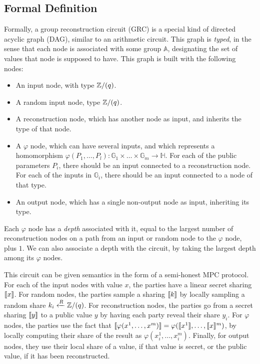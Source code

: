 \subsection{Formal Definition}

Formally, a group reconstruction circuit (GRC) is a special kind of
directed acyclic graph (DAG), similar to an arithmetic circuit.
This graph is \emph{typed}, in the sense that each node is associated
with some group $\mathbb{A}$, designating the set of values
that node is supposed to have.
This graph is built with the following nodes:

\begin{itemize}
    \item An input node, with type $\mathbb{Z}/(q)$.
    \item A random input node, type $\mathbb{Z}/(q)$.
    \item A reconstruction node, which has another node as input, and inherits the type of that node.
    \item A $\varphi$ node, which can have several inputs, and which represents
    a homomorphism
    $\varphi(P_1, \ldots, P_l) : \mathbb{G}_1 \times \ldots \times \mathbb{G}_m \to \mathbb{H}$.
    For each of the public parameters $P_i$, there should be an input connected to a reconstruction node.
    For each of the inputs in $\mathbb{G}_i$, there should be an input connected to a node of that type.
    \item An output node, which has a single non-output node as input, inheriting its type.
\end{itemize}

Each $\varphi$ node has a \emph{depth} associated with it, equal
to the largest number of reconstruction nodes on a path from an input
or random
node to the $\varphi$ node, plus $1$.
We can also associate a depth with the circuit, by taking the largest depth
among its $\varphi$ nodes.

This circuit can be given semantics in the form of a semi-honest MPC protocol.
For each of the input nodes with value $x$, the parties have a linear
secret sharing $\llbracket x\rrbracket$. For random nodes, the parties sample
a sharing $\llbracket k\rrbracket$ by locally sampling a random share $k_i \xleftarrow{R} \mathbb{Z}/(q)$.
For reconstruction nodes, the parties go from a secret sharing $\llbracket y\rrbracket$
to a public value $y$ by having each party reveal their share $y_i$.
For $\varphi$ nodes, the parties use the fact that
$\llbracket\varphi(x^1, \ldots, x^m)\rrbracket = \varphi(\llbracket x^1\rrbracket, \ldots, \llbracket x\rrbracket^m)$,
by locally computing their share of the result as $\varphi(x^1_i, \ldots, x^m_i)$.
Finally, for output nodes, they use their local share of a value, if that
value is secret, or the public value, if it has been reconstructed.

